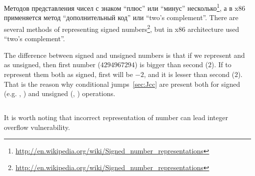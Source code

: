 ﻿\section{\SignedNumbersSectionName}
\label{sec:signednumbers}

\newcommand{\URLS}{\url{http://en.wikipedia.org/wiki/Signed_number_representations}}

\IFRU
{Методов представления чисел с знаком ``плюс'' или ``минус'' несколько\footnote{\URLS}, 
а в x86 применяется метод ``дополнительный код'' или ``two's complement''.}
{There are several methods of representing signed numbers\footnote{\URLS}, 
but in x86 architecture used ``two's complement''.}

{The difference between signed and unsigned numbers is that if we represent  and  
as unsigned, then first number ($4294967294$) is bigger than second ($2$). 
If to represent them both as signed, first will be $-2$, and it is lesser than second ($2$). 
That is the reason why conditional jumps~\ref{sec:Jcc} are present both for signed (e.g. \JG, \JL) 
and unsigned (\JA, \JB) operations.}

\subsection{}

{It is worth noting that incorrect representation of number can lead integer overflow vulnerability.}

